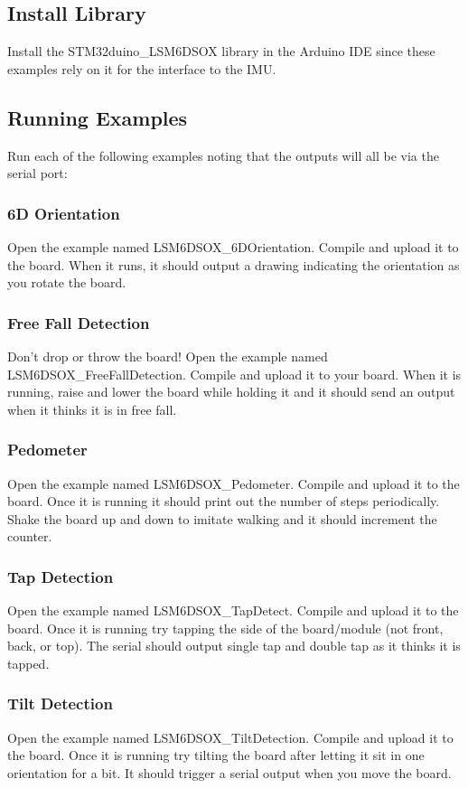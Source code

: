 \subsection{Install Library}
Install the STM32duino\_LSM6DSOX library in the Arduino IDE since these examples rely on 
it for the interface to the IMU.

\subsection{Running Examples}
Run each of the following examples noting that the outputs will all be via the serial port:

\subsubsection{6D Orientation}
Open the example named LSM6DSOX\_6DOrientation. Compile and upload it to the board. When it
runs, it should output a drawing indicating the orientation as you rotate the board.

\subsubsection{Free Fall Detection}
Don't drop or throw the board! Open the example named LSM6DSOX\_FreeFallDetection. Compile 
and upload it to your board. When it is running, raise and lower the board while holding it 
and it should send an output when it thinks it is in free fall. 

\subsubsection{Pedometer}
Open the example named LSM6DSOX\_Pedometer. Compile and upload it to the board. Once it is 
running it should print out the number of steps periodically. Shake the board up and down 
to imitate walking and it should increment the counter.

\subsubsection{Tap Detection}
Open the example named LSM6DSOX\_TapDetect. Compile and upload it to the board. Once it is 
running try tapping the side of the board/module (not front, back, or top). The serial should 
output single tap and double tap as it thinks it is tapped.

\subsubsection{Tilt Detection}
Open the example named LSM6DSOX\_TiltDetection. Compile and upload it to the board. Once it is 
running try tilting the board after letting it sit in one orientation for a bit. It should 
trigger a serial output when you move the board.

